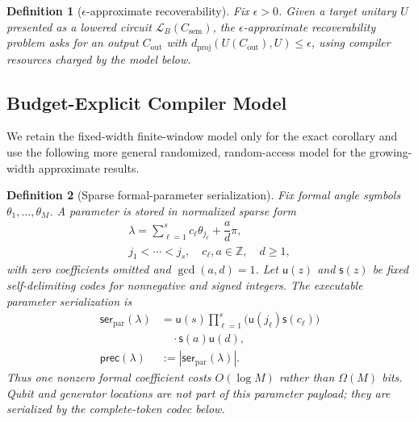 \documentclass[aps,prx,reprint,floatfix,superscriptaddress]{revtex4-2}
\newtheorem{definition}{Definition}
\newcommand{\pcharge}{\mathsf{prec}}
\begin{document}
\begin{definition}[$\epsilon$-approximate recoverability]
\label{def:approx-recoverability}
Fix $\epsilon > 0$. Given a target unitary $U$ presented as a lowered
circuit $\mathcal{L}_B(C_{\mathrm{sem}})$, the $\epsilon$-approximate
recoverability problem asks for an output $C_{\mathrm{out}}$ with
$d_{\mathrm{proj}}(U(C_{\mathrm{out}}), U) \leq \epsilon$, using compiler
resources charged by the model below.
\end{definition}

\subsection{Budget-Explicit Compiler Model}

We retain the fixed-width finite-window model only for the exact corollary
and use the following more general randomized, random-access model for the
growing-width approximate results.

\begin{definition}[Sparse formal-parameter serialization]
\label{def:parmodule}
Fix formal angle symbols $\theta_1,\ldots,\theta_M$.  A parameter is stored
in normalized sparse form
\begin{equation*}
\begin{gathered}
 \lambda=\displaystyle\sum_{\ell=1}^{s}c_\ell\theta_{j_\ell}
 +\dfrac{a}{d}\pi,\\
 j_1<\cdots<j_s,\quad c_\ell,a\in\mathbb Z,\quad d\geq1,
\end{gathered}
\end{equation*}
with zero coefficients omitted and $\gcd(a,d)=1$.  Let
$\mathsf{u}(z)$ and $\mathsf{s}(z)$ be fixed self-delimiting codes for
nonnegative and signed integers.  The executable parameter serialization is
\begin{equation}
\label{eq:precision-charge}
\begin{aligned}
 \mathsf{ser}_{\mathrm{par}}(\lambda)
 &=\mathsf{u}(s)\prod_{\ell=1}^{s}
   \bigl(\mathsf{u}(j_\ell)\mathsf{s}(c_\ell)\bigr)\\
 &\quad\cdot\mathsf{s}(a)\mathsf{u}(d),\\
 \pcharge(\lambda)&:=|\mathsf{ser}_{\mathrm{par}}(\lambda)|.
\end{aligned}
\end{equation}
Thus one nonzero formal coefficient costs $O(\log M)$ rather than
$\Omega(M)$ bits.  Qubit and generator locations are not part of this
parameter payload; they are serialized by the complete-token codec below.
\end{definition}
\end{document}
